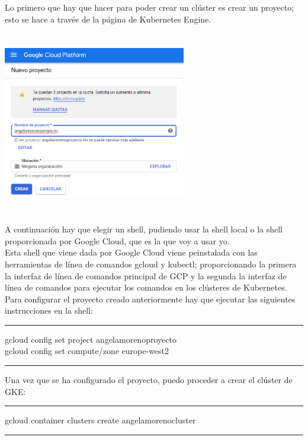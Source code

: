 \documentclass[english,runningheads,a4paper]{llncs}[2018/03/10]
\newenvironment{nscenter}
 {\parskip=0pt\par\nopagebreak\centering}
 {\par\noindent\ignorespacesafterend}
\begin{document}
Lo primero que hay que hacer para poder crear un clúster es crear un proyecto; 
esto se hace a través de la página de Kubernetes Engine.
\newline
\begin{nscenter}
\includegraphics[width=8cm,height=8cm,keepaspectratio]{./Contenedores/Googlecloud/43.png}
\end{nscenter}
\newline
A continuación hay que elegir un shell, pudiendo usar la shell local o la shell 
proporcionada por Google Cloud, que es la que voy a usar yo. \\
Esta shell que viene dada por Google Cloud viene peinstalada con las 
herramientas de línea de comandos gcloud y kubectl; proporcionando la primera 
la interfaz de línea de comandos principal de GCP y la segunda la interfaz de 
línea de comandos para ejecutar los comandos en los clústeres de Kubernetes. \\
Para configurar el proyecto creado anteriormente hay que ejecutar las 
siguientes instrucciones en la shell: 
\begin{nscenter}

\noindent\rule{10cm}{0.4pt}

gcloud config set project angelamorenoproyecto \\
gcloud config set compute/zone europe-west2

\noindent\rule{10cm}{0.4pt}
\end{nscenter}
\newline
Una vez que se ha configurado el proyecto, puedo proceder a crear el clúster de 
GKE:
\newline
\begin{nscenter}
\noindent\rule{10cm}{0.4pt}

gcloud container clusters create angelamorenocluster

\noindent\rule{10cm}{0.4pt}
\end{nscenter}
\end{document}
